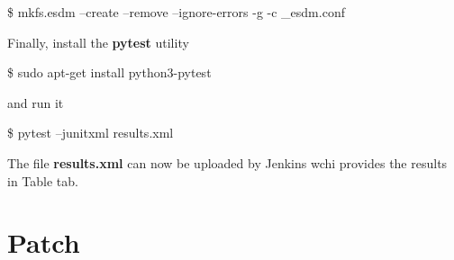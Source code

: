 \begin{framed}
\$ mkfs.esdm --create --remove --ignore-errors -g -c \_esdm.conf
\end{framed}

Finally, install the \textbf{pytest} utility

\begin{framed}
\$ sudo apt-get install python3-pytest
\end{framed}

and run it

\begin{framed}
\$ pytest --junitxml results.xml
\end{framed}

The file \textbf{results.xml} can now be uploaded by Jenkins wchi provides the results in Table tab.

\section{Patch}

